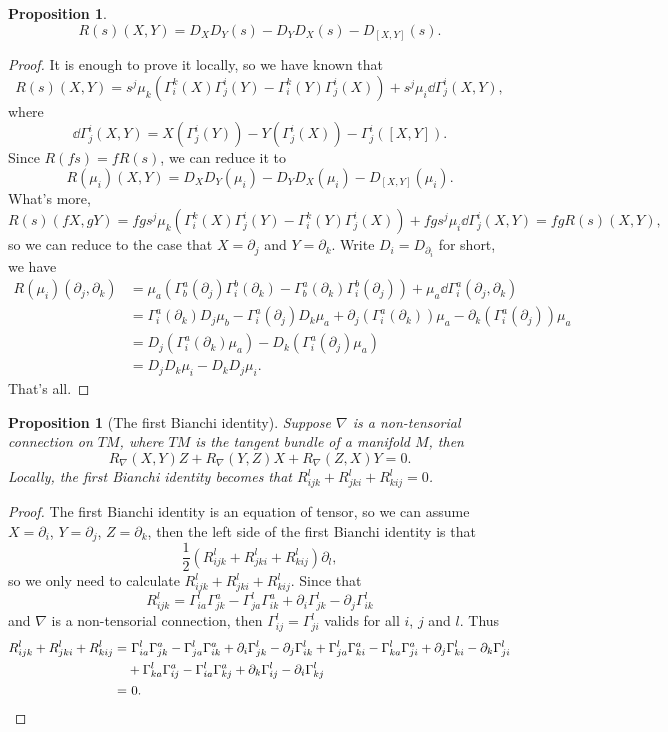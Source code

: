 \documentclass[11pt]{article}
\theoremstyle{definition}
\theoremstyle{plain}
\newtheorem{pro}[para]{Proposition}
\begin{document}
\begin{pro}
\[
	R(s)(X,Y)=D_XD_Y(s)-D_YD_X(s)-D_{[X,Y]}(s).
\]
\end{pro}

\begin{proof}
It is enough to prove it locally, so we have known that
\[
	R(s)(X,Y)=s^j\mu_k (\Gamma^k_i(X)\Gamma^i_j(Y)-\Gamma^k_i(Y)\Gamma^i_j(X))
	+s^j\mu_i \dd \Gamma^i_j(X,Y),
\]
where
\[
	\dd \Gamma^i_j(X,Y)=X(\Gamma^i_j(Y))-Y(\Gamma^i_j(X))-\Gamma^i_j([X,Y]).
\]
Since $R(fs)=fR(s)$, we can reduce it to
\[
	R(\mu_i)(X,Y)=D_XD_Y(\mu_i)-D_YD_X(\mu_i)-D_{[X,Y]}(\mu_i).
\]
What's more,
\[
	R(s)(fX,gY)=fgs^j\mu_k (\Gamma^k_i(X)\Gamma^i_j(Y)-\Gamma^k_i(Y)\Gamma^i_j(X))
	+fgs^j\mu_i \dd \Gamma^i_j(X,Y)=fgR(s)(X,Y),
\]
so we can reduce to the case that $X=\partial_j$ and $Y=\partial_k$. Write $D_i=D_{\partial_i}$ for short, we have
\begin{align*}
	R(\mu_i)(\partial_j,\partial_k)&=\mu_a (\Gamma^a_b(\partial_j)\Gamma^b_i(\partial_k)-\Gamma^a_b(\partial_k)\Gamma^b_i(\partial_j))
	+\mu_a \dd \Gamma^a_i(\partial_j,\partial_k)\\
	&=\Gamma^a_i(\partial_k)D_{j}\mu_b-\Gamma^a_i(\partial_j)D_{k}\mu_a+\partial_j\left(\Gamma^a_i(\partial_k)\right)\mu_a-\partial_k\left(\Gamma^a_i(\partial_j)\right)\mu_a\\
	&=D_j(\Gamma^a_i(\partial_k)\mu_a)-D_k(\Gamma^a_i(\partial_j)\mu_a)\\
	&=D_jD_k\mu_i-D_kD_j\mu_i.
\end{align*}
That's all.
\end{proof}

\begin{pro}[The first Bianchi identity]
Suppose $\nabla$ is a non-tensorial connection on $TM$, where $TM$ is the tangent bundle of a manifold $M$, then
\[
	R_\nabla(X,Y)Z+R_\nabla(Y,Z)X+R_\nabla(Z,X)Y=0.
\]
Locally, the first Bianchi identity becomes that $R_{ijk}^l+R_{jki}^l+R_{kij}^l=0$.
\end{pro}

\begin{proof}
The first Bianchi identity is an equation of tensor, so we can assume $X=\partial_i$, $Y=\partial_j$, $Z=\partial_k$, then the left side of the first Bianchi identity is that
\[
	\frac 12(R_{ijk}^l+R_{jki}^l+R_{kij}^l)\partial_l,
\]
so we only need to calculate $R_{ijk}^l+R_{jki}^l+R_{kij}^l$. Since that
\[
	R_{ijk}^l=\Gamma^l_{ia}\Gamma^a_{jk}-\Gamma^l_{ja}\Gamma^a_{ik}+\partial_i\Gamma^l_{jk}-\partial_j\Gamma^l_{ik}
\]
and $\nabla$ is a non-tensorial connection, then $\Gamma^l_{ij}=\Gamma^l_{ji}$ valids for all $i$, $j$ and $l$. Thus
\begin{align*}
R_{ijk}^l+R_{jki}^l+R_{kij}^l=&\,\,\Gamma^l_{ia}\Gamma^a_{jk}-\Gamma^l_{ja}\Gamma^a_{ik}+\partial_i\Gamma^l_{jk}-\partial_j\Gamma^l_{ik}+\Gamma^l_{ja}\Gamma^a_{ki}-\Gamma^l_{ka}\Gamma^a_{ji}+\partial_j\Gamma^l_{ki}-\partial_k\Gamma^l_{ji}\\
&+\Gamma^l_{ka}\Gamma^a_{ij}-\Gamma^l_{ia}\Gamma^a_{kj}+\partial_k\Gamma^l_{ij}-\partial_i\Gamma^l_{kj}\\
=&\,\,0.\qedhere
\end{align*}
\end{proof}
\end{document}

